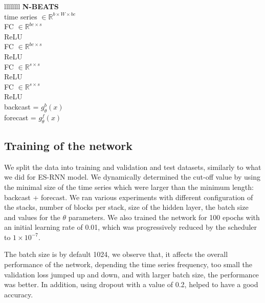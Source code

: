 \documentclass{article}
\begin{document}
\begin{table}[!ht]
	\centering
	\begin{tabular}{llllllll} 
		\midrule
			 {\textbf{N-BEATS}} \\
		\midrule
			 {time series $\in \mathbb{R}^{b \times W \times bc}$} \\
		\midrule
			 {FC  $\in \mathbb{R}^{bc \times s}$} \\		
		\midrule
			 {ReLU} \\		
		\midrule
			 {FC  $\in \mathbb{R}^{bc \times s}$} \\		
		\midrule
			 {ReLU} \\		
		\midrule
			 {FC  $\in \mathbb{R}^{s \times s}$} \\		
		\midrule
			 {ReLU} \\		
		\midrule
			 {FC  $\in \mathbb{R}^{s \times s}$} \\		
		\midrule
			 {ReLU} \\		
		\midrule
			 {backcast = $g_\theta^b(x)$} \\		
			 {forecast = $g_\theta^f(x)$} \\		
		\midrule
	\end{tabular}
	\caption{N-BEATS architecture. Let $b$ the batch size, W is the number of input windows, bc backcast length, s is the size of the hidden layer.}
	\label{tab:nbeatsstack}
\end{table}

\subsection{Training of the network}
We split the data into training and validation and test datasets, similarly to what we did for ES-RNN model.
We dynamically determined the cut-off value by using the minimal size of the time series which
were larger than the minimum length: backcast + forecast. We ran various experiments with different configuration of the stacks, number of blocks per stack, 
size of the hidden layer, the batch size and values  for the $\theta$ parameters.  We also trained the network for 100 epochs with an initial learning rate of 0.01,
 which was progressively reduced by the scheduler to $1 \times 10^{-7}$.

 The batch size is by default 1024, we observe that, it affects the overall performance of the network, depending the time series frequency,
 too small the validation loss jumped up and down, and with larger batch size, the performance was better.
 In addition, using dropout with a value of 0.2, helped to have a good accuracy.
\end{document}
